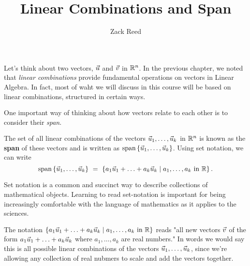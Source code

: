 \documentclass{ximera}
\author{Zack Reed}
\title{Linear Combinations and Span}
\begin{document}
\begin{abstract}

\end{abstract}
\maketitle

Let's think about two vectors, $\vec{u}$ and $\vec{v}$ in $\mathbb{R}^n$. In the previous chapter, we noted that \emph{linear combinations} provide fundamental operations on vectors in Linear Algebra. In fact, most of waht we will discuss in this course will be based on linear combinations, structured in certain ways.

\begin{exploration}

One important way of thinking about how vectors relate to each other is to consider their \emph{span}.


\begin{definition}
  The set of all linear combinations of the vectors
  $\vec{u}_1, \ldots,\vec{u}_k$ in $\mathbb{R}^n$ is known as the
  \textbf{span}%
   of these vectors and is written as
  $\text{span}\left\{\vec{u}_1,\ldots,\vec{u}_k\right\}$. Using set notation, we
  can write
  \begin{equation*}
    \text{span}\left\{\vec{u}_1,\ldots,\vec{u}_k\right\}
    ~=~ \left\{a_1\vec{u}_1+\ldots+a_k\vec{u}_k \mid a_1,\ldots,a_k\text{ in }\mathbb{R}\right\}.
  \end{equation*}
  \begin{hint}
  
    Set notation is a common and succinct way to describe collections of mathematical objects. Learning to read set-notation is important for being increasingly comfortable with the language of mathematics as it applies to the sciences.

    The notation $\left\{a_1\vec{u}_1+\ldots+a_k\vec{u}_k \mid a_1,\ldots,a_k\text{ in }\mathbb{R}\right\}$ reads "all new vectors $\vec{v}$ of the form $a_1\vec{u}_1+\ldots+a_k\vec{u}_k$ where $a_1,\ldots,a_k$ are real numbers." In words we would say this is all possible linear combinations of the vectors $\vec{u}_1,\ldots,\vec{u}_k$, since we're allowing any collection of real nubmers to scale and add the vectors together.

  \end{hint}
\end{definition}


\end{exploration}
\end{document}
